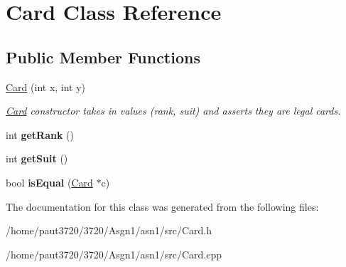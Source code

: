 \hypertarget{class_card}{\section{Card Class Reference}
\label{class_card}
}
\subsection*{Public Member Functions}
\begin{DoxyCompactItemize}
\item 
\hypertarget{class_card_a9bfbcc40169deb3b96eb068e96edad63}{\hyperlink{class_card_a9bfbcc40169deb3b96eb068e96edad63}{Card} (int x, int y)}\label{class_card_a9bfbcc40169deb3b96eb068e96edad63}

\begin{DoxyCompactList}\small\item\em \hyperlink{class_card}{Card} constructor takes in values (rank, suit) and asserts they are legal cards. \end{DoxyCompactList}\item 
\hypertarget{class_card_ab11d37fe0155982e834cd4c413322973}{int {\bfseries get\-Rank} ()}\label{class_card_ab11d37fe0155982e834cd4c413322973}

\item 
\hypertarget{class_card_ad82a99d71c4659f9ff66a716151ef910}{int {\bfseries get\-Suit} ()}\label{class_card_ad82a99d71c4659f9ff66a716151ef910}

\item 
\hypertarget{class_card_afa69449115f48656c960de31aa7010a6}{bool {\bfseries is\-Equal} (\hyperlink{class_card}{Card} $\ast$c)}\label{class_card_afa69449115f48656c960de31aa7010a6}

\end{DoxyCompactItemize}


The documentation for this class was generated from the following files\-:\begin{DoxyCompactItemize}
\item 
/home/paut3720/3720/\-Asgn1/asn1/src/Card.\-h\item 
/home/paut3720/3720/\-Asgn1/asn1/src/Card.\-cpp\end{DoxyCompactItemize}
